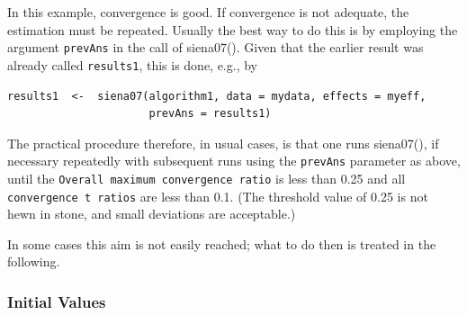 \documentclass[a4paper,fleqn,11pt]{article}
\newcommand{\+}{\, + \,}
\newcommand{\sfn}[1]{\textsf{#1}}
\begin{document}
In this example, convergence is good.
If convergence is not adequate, the estimation must be repeated.
Usually the best way to do this is by employing the
argument \texttt{prevAns} in the call of \sfn{siena07()}.
Given that the earlier result was already called \texttt{results1},
this is done, e.g., by
\begin{verbatim}
results1  <-  siena07(algorithm1, data = mydata, effects = myeff,
                      prevAns = results1)
\end{verbatim}
The practical procedure therefore, in usual cases, is that
one runs \sfn{siena07()}, if necessary repeatedly with
subsequent runs using the \texttt{prevAns} parameter as above,
until the \texttt{Overall maximum convergence ratio} is less than 0.25
and all  \texttt{\small convergence t ratios}
are less than 0.1.
(The threshold value of 0.25 is not hewn in stone,
and small deviations are acceptable.)

In some cases this aim is not easily reached;
what to do then is treated in the following.

\subsubsection{Initial Values}
\label{S_initials}
\end{document}
